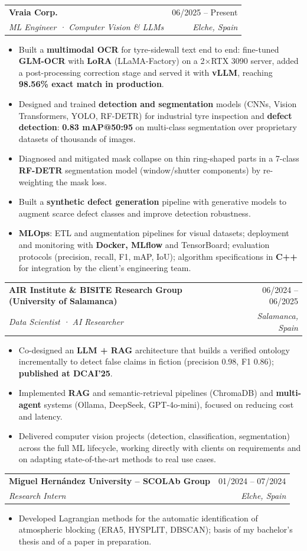 \documentclass[a4paper,11pt]{article}
\makeatletter
\newcommand{\resumeItem}[1]{\item\small{#1 \vspace{-2pt}}}
\newcommand{\resumeSubheading}[4]{
  \vspace{-1pt}\item
    \begin{tabular*}{\textwidth}[t]{l@{\extracolsep{\fill}}r}
      \textbf{#1} & #2 \\
      \textit{\small#3} & \textit{\small #4} \\
    \end{tabular*}\vspace{-5pt}
}
\newcommand{\resumeItemListStart}{\begin{itemize}[leftmargin=0.18in, itemsep=0pt, topsep=1pt, parsep=0pt]}
\newcommand{\resumeItemListEnd}{\end{itemize}\vspace{-5pt}}
\makeatother
\begin{document}
  \resumeSubheading
    {Vraia Corp.}{06/2025 -- Present}
    {ML Engineer · Computer Vision \& LLMs}{Elche, Spain}
    \resumeItemListStart
      \resumeItem{Built a \textbf{multimodal OCR} for tyre-sidewall text end to end: fine-tuned \textbf{GLM-OCR} with \textbf{LoRA} (LLaMA-Factory) on a 2$\times$RTX 3090 server, added a post-processing correction stage and served it with \textbf{vLLM}, reaching \textbf{98.56\% exact match in production}.}
      \resumeItem{Designed and trained \textbf{detection and segmentation} models (CNNs, Vision Transformers, YOLO, RF-DETR) for industrial tyre inspection and \textbf{defect detection}: \textbf{0.83 mAP@50:95} on multi-class segmentation over proprietary datasets of thousands of images.}
      \resumeItem{Diagnosed and mitigated mask collapse on thin ring-shaped parts in a 7-class \textbf{RF-DETR} segmentation model (window/shutter components) by re-weighting the mask loss.}
      \resumeItem{Built a \textbf{synthetic defect generation} pipeline with generative models to augment scarce defect classes and improve detection robustness.}
      \resumeItem{\textbf{MLOps}: ETL and augmentation pipelines for visual datasets; deployment and monitoring with \textbf{Docker, MLflow} and TensorBoard; evaluation protocols (precision, recall, F1, mAP, IoU); algorithm specifications in \textbf{C++} for integration by the client's engineering team.}
    \resumeItemListEnd

  \resumeSubheading
    {AIR Institute \& BISITE Research Group (University of Salamanca)}{06/2024 -- 06/2025}
    {Data Scientist · AI Researcher}{Salamanca, Spain}
    \resumeItemListStart
      \resumeItem{Co-designed an \textbf{LLM + RAG} architecture that builds a verified ontology incrementally to detect false claims in fiction (precision 0.98, F1 0.86); \textbf{published at DCAI'25}.}
      \resumeItem{Implemented \textbf{RAG} and semantic-retrieval pipelines (ChromaDB) and \textbf{multi-agent} systems (Ollama, DeepSeek, GPT-4o-mini), focused on reducing cost and latency.}
      \resumeItem{Delivered computer vision projects (detection, classification, segmentation) across the full ML lifecycle, working directly with clients on requirements and on adapting state-of-the-art methods to real use cases.}
    \resumeItemListEnd

  \resumeSubheading
    {Miguel Hernández University -- SCOLAb Group}{01/2024 -- 07/2024}
    {Research Intern}{Elche, Spain}
    \resumeItemListStart
      \resumeItem{Developed Lagrangian methods for the automatic identification of atmospheric blocking (ERA5, HYSPLIT, DBSCAN); basis of my bachelor's thesis and of a paper in preparation.}
    \resumeItemListEnd
\end{document}
